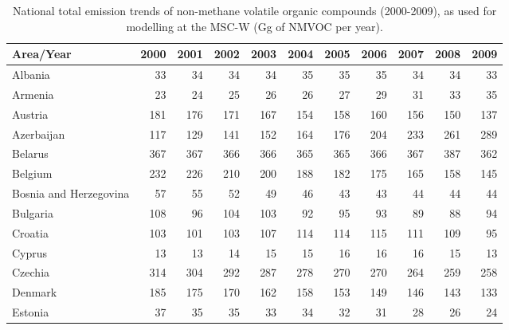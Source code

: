  \begin{table}
 \caption{National total emission trends of non-methane volatile organic compounds (2000-2009), as used for modelling at the MSC-W (Gg of  NMVOC per year).}
 
 \vspace{15pt}
 
 \scriptsize
 \centering
 \begin{tabular}{|l|r|r|r|r|r|r|r|r|r|r|}
 \hline
                     Area/Year&   2000&   2001&   2002&   2003&   2004&   2005&   2006&   2007&   2008&   2009\\\hline\hline
                       Albania&     33&     34&     34&     34&     35&     35&     35&     34&     34&     33\\\hline
                       Armenia&     23&     24&     25&     26&     26&     27&     29&     31&     33&     35\\\hline
                       Austria&    181&    176&    171&    167&    154&    158&    160&    156&    150&    137\\\hline
                    Azerbaijan&    117&    129&    141&    152&    164&    176&    204&    233&    261&    289\\\hline
                       Belarus&    367&    367&    366&    366&    365&    365&    366&    367&    387&    362\\\hline
                       Belgium&    232&    226&    210&    200&    188&    182&    175&    165&    158&    145\\\hline
        Bosnia and Herzegovina&     57&     55&     52&     49&     46&     43&     43&     44&     44&     44\\\hline
                      Bulgaria&    108&     96&    104&    103&     92&     95&     93&     89&     88&     94\\\hline
                       Croatia&    103&    101&    103&    107&    114&    114&    115&    111&    109&     95\\\hline
                        Cyprus&     13&     13&     14&     15&     15&     16&     16&     16&     15&     13\\\hline
                       Czechia&    314&    304&    292&    287&    278&    270&    270&    264&    259&    258\\\hline
                       Denmark&    185&    175&    170&    162&    158&    153&    149&    146&    143&    133\\\hline
                       Estonia&     37&     35&     35&     33&     34&     32&     31&     28&     26&     24\\\hline

\end{tabular}
\end{table}
